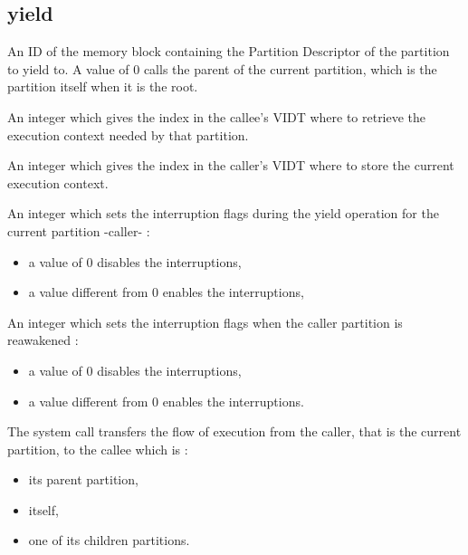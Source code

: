 \documentclass[10pt,a4paper,titlepage]{refart}
\begin{document}
\subsection{yield}
An ID of the memory block containing the Partition Descriptor of the partition to yield to.
A value of 0 calls the parent of the current partition, which is the partition itself when it is the root.

An integer which gives the index in the callee's VIDT where to retrieve the execution context needed by that partition.

An integer which gives the index in the caller's VIDT where to store the current execution context.

An integer which sets the interruption flags during the yield operation for the current partition -caller- :
\begin{itemize}
    \item a value of 0 disables the interruptions,
    \item a value different from 0 enables the interruptions,
\end{itemize}

An integer which sets the interruption flags when the caller partition is reawakened :
\begin{itemize}
    \item a value of 0 disables the interruptions,
    \item a value different from 0 enables the interruptions.
\end{itemize}

\medskip
The system call transfers the flow of execution from the caller, that is the current partition, to the callee which is :
\begin{itemize}
    \item its parent partition,
    \item itself,
    \item one of its children partitions.
\end{itemize}
\end{document}
